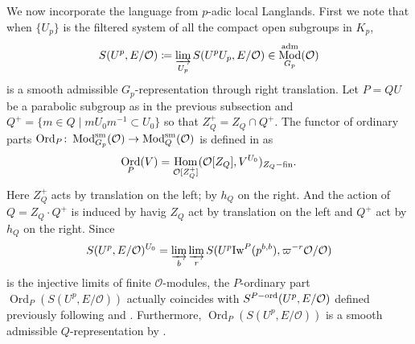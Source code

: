 \documentclass[leqno]{amsart}
\newcommand{\Iw}{\textnormal{Iw}}
\DeclareMathOperator{\Mod}{\textnormal{Mod}}
\DeclareMathOperator{\Ord}{Ord}
\newcommand{\sm}{\textnormal{sm}}
\newcommand{\adm}{\textnormal{adm}}
\newcommand{\fin}{\textnormal{fin}}
\newcommand{\ord}{\textnormal{ord}}
\newcommand{\oo}{\mathcal{O}} %
\DeclareMathOperator{\Hom}{Hom}
\theoremstyle{definition}
\theoremstyle{remark}
\begin{document}
We now incorporate the language from $p$-adic
local Langlands. 
First we note that 
when $\{U_p\}$ is the filtered system of 
all the compact open subgroups in $K_p$,
\[
	S(U^p,E/\oo)\coloneqq
	\varinjlim_{U_p}S(U^pU_p,E/\oo)\in 
	\Mod^{\adm}_{G_p}(\oo)
\]
is a smooth admissible $G_p$-representation
through right translation.
Let $P=QU$ be a parabolic subgroup 
as in the previous subsection
and $Q^+=\{m\in Q\mid mU_0m^{-1}\subset U_0\}$ 
so that $Z_Q^+=Z_Q\cap Q^+$.
The functor of ordinary parts
$ \Ord_P\colon \Mod^{\sm}_{G_p}(\oo)\to \Mod^{\sm}_Q(\oo)$
is defined in \cite{emeI} as
\[
	\Ord_P(V)=\Hom_{\oo[Z_Q^+]}(\oo[Z_Q], V^{U_0})_{Z_Q-\fin}.
\]
Here $Z_Q^+$ acts by translation on the left; 
by $h_Q$ on the right.
And the action of $Q=Z_Q\cdot Q^+$ is induced by 
havig $Z_Q$ act by translation on the left and 
$Q^+$ act by $h_Q$ on the right.
Since 
\[
	S(U^p,E/\oo)^{U_0}=
	\varinjlim_{b}\varinjlim_r
	S(U^p\Iw^P(p^{b,b}),\varpi^{-r}\oo/\oo)
\]
is the injective limits of finite $\oo$-modules,
the $P$-ordinary part
$\Ord_P(S(U^p,E/\oo))$ actually 
coincides with  $S^{P-\ord}(U^p,E/\oo)$
defined previously following 
\cite[Lem 3.1.5]{emeI} and \cite[Prop 3.2.4]{emeI}.
Furthermore, 
$\Ord_P(S(U^p,E/\oo))$ is a smooth admissible
$Q$-representation by
\cite[Thm 3.3.3]{emeI}.
\end{document}
